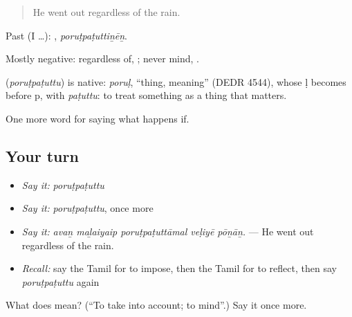 \begin{quote}
He went out regardless of the rain.
\end{quote}

Past (I …): , \emph{poruṭpaṭuttiṉēṉ}.

Mostly negative: regardless of, ; never mind,  .

\begin{cousinweb}
\textbf{} (\emph{poruṭpaṭuttu}) is native: \emph{poruḷ}, \textquotedblleft{}thing, meaning\textquotedblright{} (DEDR 4544), whose ḷ becomes  before p, with \emph{paṭuttu}: to treat something as a thing that matters.
\end{cousinweb}

\begin{grammarlens}[title={What you've built}]
One more word for saying what happens if.
\end{grammarlens}

\subsection*{Your turn}
\begin{itemize}
\raggedright
  \item \emph{Say it:} \emph{poruṭpaṭuttu}
  \item \emph{Say it:} \emph{poruṭpaṭuttu}, once more
  \item \emph{Say it:} \emph{avaṉ maḻaiyaip poruṭpaṭuttāmal veḷiyē pōṉāṉ.} — He went out regardless of the rain.
  \item \emph{Recall:} say the Tamil for to impose, then the Tamil for to reflect, then say \emph{poruṭpaṭuttu} again
\end{itemize}

\begin{tcolorbox}[breakable,colback=teal!4,colframe=teal!35!black,title={Before you move on}]
What does  mean? (\textquotedblleft{}To take into account; to mind\textquotedblright{}.) Say it once more.
\end{tcolorbox}
